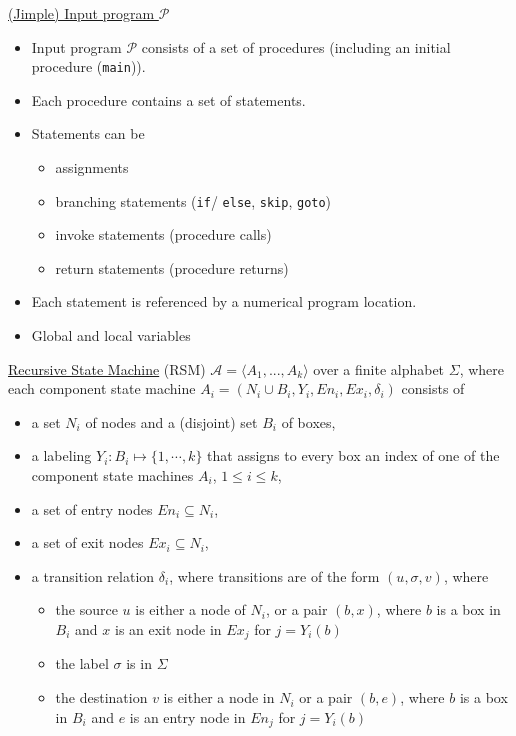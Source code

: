 \documentclass[a4paper,12pt]{article}
\begin{document}
\underline{(Jimple) Input program $\mathcal{P}$}
\begin{itemize}
	\item Input program $\mathcal{P}$ consists of a set of procedures (including an initial procedure (\texttt{main})).
	\item Each procedure contains a set of statements. 
	\item Statements can be
	\begin{itemize}
		\item assignments
		\item branching statements (\texttt{if}/ \texttt{else}, \texttt{skip}, \texttt{goto})
		\item invoke statements (procedure calls)
		\item return statements (procedure returns)
	\end{itemize}
	\item Each statement is referenced by a numerical program location.
	\item Global and local variables
\end{itemize}

\underline{Recursive State Machine} (RSM) $\mathcal{A}=\langle A_1, ..., A_k \rangle$ over a finite alphabet $\Sigma$, where each component state machine $A_i=(N_i \cup B_i, Y_i, En_i, Ex_i, \delta_i)$ consists of
\begin{itemize}
	\item a set $N_i$ of nodes and a (disjoint) set $B_i$ of boxes,
	\item a labeling $Y_i: B_i \mapsto \{1, \cdots, k\}$ that assigns to every box an index of one of the component state machines $A_i$, $1 \leq i \leq k$,
	\item a set of entry nodes $En_i \subseteq N_i$,
	\item a set of exit nodes $Ex_i \subseteq N_i$,
	\item a transition relation $\delta_i$, where transitions are of the form $(u, \sigma, v)$, where
	\begin{itemize}
		\item the source $u$ is either a node of $N_i$, or a pair $(b,x)$, where $b$ is a box in $B_i$ and $x$ is an exit node in $Ex_j$ for $j=Y_i(b)$
		\item the label $\sigma$ is in $\Sigma$
		\item the destination $v$ is either a node in $N_i$ or a pair $(b,e)$, where $b$ is a box in $B_i$ and $e$ is an entry node in $En_j$ for $j=Y_i(b)$
	\end{itemize}
\end{itemize}
\end{document}
